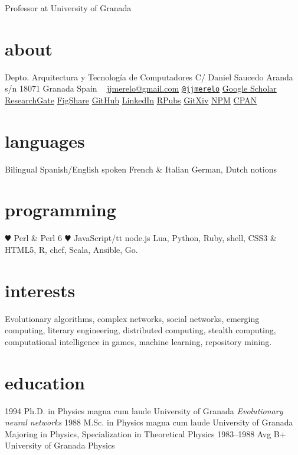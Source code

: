 \documentclass[]{friggeri-jj-cv}
\begin{document}
       {Professor at University of Granada}

\begin{aside}
  \section{about}
    Depto. Arquitectura y Tecnología de Computadores
    C/ Daniel Saucedo Aranda s/n
    18071 Granada
    Spain
    ~
    \href{mailto:jjmerelo@gmail.com}{jjmerelo@gmail.com}
    \href{http://twitter.com/jjmerelo}{{\tt @jjmerelo}}
    \href{http://scholar.google.com/citations?user=gFxqc64AAAAJ}{Google Scholar}
    \href{https://www.researchgate.net/profile/JJ_Merelo}{ResearchGate}
    \href{https://figshare.com/authors/Juan_J_Merelo/541327}{FigShare}
   \href{https://github.com/JJ}{GitHub}
   \href{http://lnkd.in/dBVqYPa}{LinkedIn}
   \href{http://rpubs.com/jjmerelo/}{RPubs}
   \href{http://gitxiv.com/users/jj-merelo}{GitXiv}
   \href{https://www.npmjs.com/~jjmerelo}{NPM}
   \href{http://search.cpan.org/~jmerelo/}{CPAN}
  \section{languages}
    Bilingual Spanish/English
    spoken French \& Italian
    German, Dutch notions
  \section{programming}
    {\color{red} \large $\varheartsuit$} Perl \& Perl 6
    {\color{red} $\varheartsuit$} JavaScript/{tt node.js}
    Lua, Python, Ruby, shell, CSS3 \& HTML5, R, chef, Scala, Ansible, Go.
\end{aside}

\section{interests}

Evolutionary algorithms, complex networks, social networks, emerging
computing, literary engineering, distributed computing, stealth
computing, computational intelligence in games, machine learning,
repository mining.

\section{education}

\begin{entrylist}
  \entry
    {1994}
    {Ph.D. {\normalfont in Physics} magna cum laude}
    {University of Granada}
    {\emph{Evolutionary neural networks}}
  \entry
    {1988}
    {M.Sc. {\normalfont in Physics} magna cum laude}
    {University of Granada}
    {Majoring in Physics, Specialization in Theoretical Physics}
  \entry
    {1983–1988}
    {Avg B+}
    {University of Granada}
    {Physics}
\end{entrylist}
\end{document}
